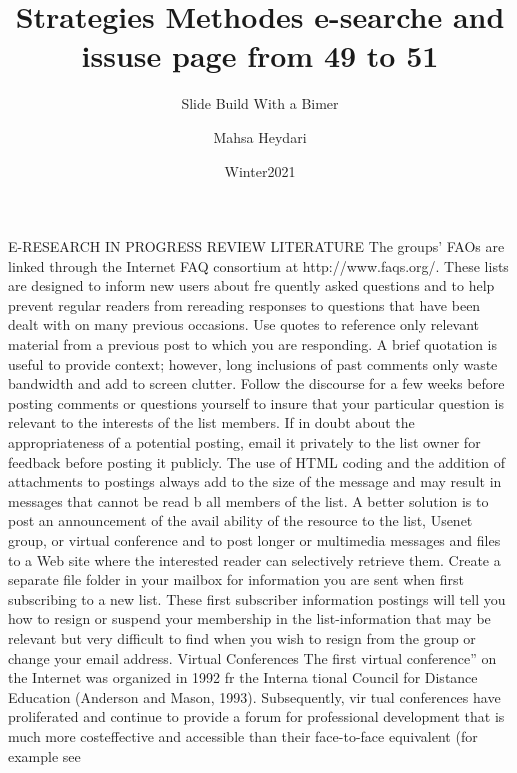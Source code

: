 \documentclass{beamer}
\title{Strategies Methodes e-searche and issuse page from 49 to 51}
\subtitle{Slide Build With a Bimer‌}
\author{Mahsa Heydari}
\institute{Notrh Payam Nour University}
\date{Winter2021}
\begin{document}
\begin{frame}
\maketitle
\end{frame}

\everypar{\rightskip\rightmargin}
\begin{frame}{E-RESEARCH IN PROGRESS REVIEW LITERATURE}
The groups’ FAOs are linked through the Internet FAQ consortium at
http://www.faqs.org/. These lists are designed to inform new users about
fre quently asked questions and to help prevent regular readers from rereading
responses to questions that have been dealt with on many previous
occasions. Use quotes to reference only relevant material from a previous
post to which you are responding. A brief quotation is useful to provide
context; however, long inclusions of past comments only waste bandwidth
and add to screen clutter. Follow the discourse for a few weeks before posting
comments or questions yourself to insure that your particular question
is relevant to the interests of the list members.
If in doubt about the appropriateness of a potential posting, email it privately
to the list owner for feedback before posting it publicly. The use of
HTML coding and the addition of attachments to postings always add to
the size of the message and may result in messages that cannot be read b
all members of the list. A better solution is to post an announcement of the
avail ability of the resource to the list, Usenet group, or virtual conference
and to post longer or multimedia messages and files to a Web site where
the interested reader can selectively retrieve them.
Create a separate file folder in your mailbox for information you are sent
when first subscribing to a new list. These first subscriber information
postings will tell you how to resign or suspend your membership in the
list-information that may be relevant but very difficult to find when you
wish to resign from the group or change your email address.
Virtual Conferences
The first virtual conference” on the Internet was organized in 1992 fr
the Interna tional Council for Distance Education (Anderson and Mason,
1993). Subsequently, vir tual conferences have proliferated and continue
to provide a forum for professional development that is much more costeffective
and accessible than their face-to-face equivalent (for example see

\end{frame}
\end{document}
